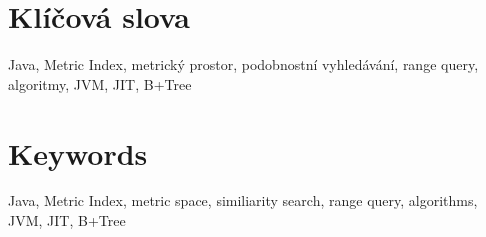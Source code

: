 \section*{Klíčová slova}
Java, \MIndex{} Metric Index, metrický prostor, podobnostní vyhledávání, range query, algoritmy, JVM, JIT, B+Tree
\section*{Keywords}
Java, \MIndex{} Metric Index, metric space, similiarity search, range query, algorithms, JVM, JIT, B+Tree
\newpage